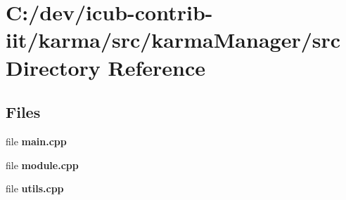 \section{C\+:/dev/icub-\/contrib-\/iit/karma/src/karma\+Manager/src Directory Reference}
\label{dir_7487e53a8124ea55fc67b4fc4eb7b40c}
\subsection*{Files}
\begin{DoxyCompactItemize}
\item 
file {\bfseries main.\+cpp}
\item 
file {\bfseries module.\+cpp}
\item 
file {\bfseries utils.\+cpp}
\end{DoxyCompactItemize}

